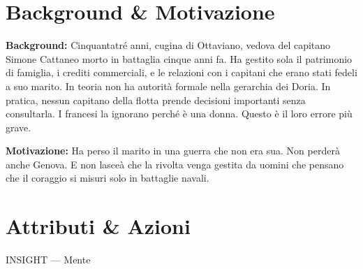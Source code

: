 \clearpage


\section*{Background \& Motivazione}

\begin{rulebox}{}
  \textbf{Background:} Cinquantatré anni, cugina di Ottaviano, vedova del capitano
  Simone Cattaneo morto in battaglia cinque anni fa. Ha gestito sola il patrimonio
  di famiglia, i crediti commerciali, e le relazioni con i capitani che erano stati
  fedeli a suo marito. In teoria non ha autorità formale nella gerarchia dei Doria.
  In pratica, nessun capitano della flotta prende decisioni importanti senza
  consultarla. I francesi la ignorano perché è una donna. Questo è il loro errore
  più grave.

  \medskip\noindent\textcolor{DoriaBlue}{\textbf{Motivazione:}} Ha perso il marito
  in una guerra che non era sua. Non perderà anche Genova. E non lasceà che la
  rivolta venga gestita da uomini che pensano che il coraggio si misuri solo
  in battaglie navali.
\end{rulebox}

\section*{Attributi \& Azioni}



\begin{attributoblock}[DoriaBlue]{INSIGHT — Mente}
\end{attributoblock}


